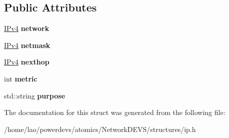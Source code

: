 \subsection*{Public Attributes}
\begin{DoxyCompactItemize}
\item 
\hyperlink{structIPv4}{I\+Pv4} {\bfseries network}\hypertarget{structip_1_1Routing__entry_a71f05d75bccb8d9c22279d7dd85ae8d4}{}\label{structip_1_1Routing__entry_a71f05d75bccb8d9c22279d7dd85ae8d4}

\item 
\hyperlink{structIPv4}{I\+Pv4} {\bfseries netmask}\hypertarget{structip_1_1Routing__entry_ada2fd8977a73fe53ba46e33d27ff2aa6}{}\label{structip_1_1Routing__entry_ada2fd8977a73fe53ba46e33d27ff2aa6}

\item 
\hyperlink{structIPv4}{I\+Pv4} {\bfseries nexthop}\hypertarget{structip_1_1Routing__entry_a0cc799eaa340a36f5ee85b0ae481a89d}{}\label{structip_1_1Routing__entry_a0cc799eaa340a36f5ee85b0ae481a89d}

\item 
int {\bfseries metric}\hypertarget{structip_1_1Routing__entry_ae1716d85035bef832f0efb163834a654}{}\label{structip_1_1Routing__entry_ae1716d85035bef832f0efb163834a654}

\item 
std\+::string {\bfseries purpose}\hypertarget{structip_1_1Routing__entry_a2ab5f00c9e3a4b2a707e236a82f9a2ce}{}\label{structip_1_1Routing__entry_a2ab5f00c9e3a4b2a707e236a82f9a2ce}

\end{DoxyCompactItemize}


The documentation for this struct was generated from the following file\+:\begin{DoxyCompactItemize}
\item 
/home/lao/powerdevs/atomics/\+Network\+D\+E\+V\+S/structures/ip.\+h\end{DoxyCompactItemize}
